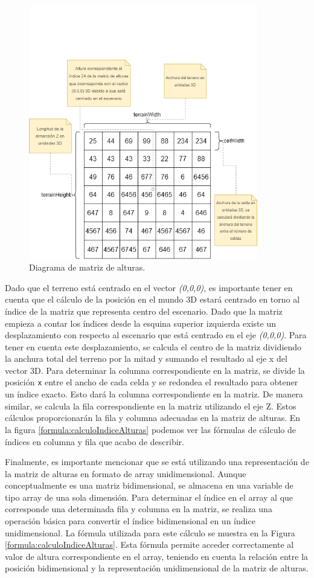 \documentclass[a4paper, 11pt]{book}
\begin{document}
\begin{figure}[h]
  \centering
  \includegraphics[width=10cm, keepaspectratio]{img/terrain.drawio.png}
  \caption{Diagrama de matriz de alturas.}
  \label{fig:terrainDrawio}
\end{figure}
Dado que el terreno está centrado en el vector \emph{(0,0,0)}, es importante tener en cuenta que el cálculo de la posición en el mundo \textsc{3D} estará centrado en torno al índice de la matriz que representa centro del escenario. 
Dado que la matriz empieza a contar los índices desde la esquina superior izquierda existe un desplazamiento con respecto al escenario que está centrado en el eje \emph{(0,0,0)}.
Para tener en cuenta este desplazamiento, se calcula el centro de la matriz dividiendo la anchura total del terreno por la mitad y sumando el resultado al eje x del vector 3D. 
Para determinar la columna correspondiente en la matriz, se divide la posición \texttt{x} entre el ancho de cada celda y se redondea el resultado para obtener un índice exacto. Esto dará la columna correspondiente en la matriz. 
De manera similar, se calcula la fila correspondiente en la matriz utilizando el eje Z. Estos cálculos proporcionarán la fila y columna adecuadas en la matriz de alturas.
En la figura \ref{formula:calculoIndiceAlturas} podemos ver las fórmulas de cálculo de índices en columna y fila que acabo de describir.

Finalmente, es importante mencionar que se está utilizando una representación de la matriz de alturas en formato de array unidimensional. Aunque conceptualmente es una matriz bidimensional, se almacena en una variable de tipo array de una sola dimensión. 
Para determinar el índice en el array al que corresponde una determinada fila y columna en la matriz, se realiza una operación básica para convertir el índice bidimensional en un índice unidimensional.
La fórmula utilizada para este cálculo se muestra en la Figura \ref{formula:calculoIndiceAlturas}. Esta fórmula permite acceder correctamente al valor de altura correspondiente en el array, teniendo en cuenta la relación entre la posición bidimensional y la representación unidimensional de la matriz de alturas.
\end{document}
